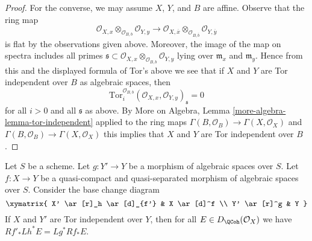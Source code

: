\begin{proof}
\medskip\noindent
For the converse, we may assume $X$, $Y$, and $B$ are affine.
Observe that the ring map
$$
\mathcal{O}_{X, x} \otimes_{\mathcal{O}_{B, b}} \mathcal{O}_{Y, y}
\longrightarrow
\mathcal{O}_{X, \overline{x}} \otimes_{\mathcal{O}_{B, \overline{b}}}
\mathcal{O}_{Y, \overline y}
$$
is flat by the observations given above. Moreover, the image of the map
on spectra includes all primes
$\mathfrak s \subset
\mathcal{O}_{X, x} \otimes_{\mathcal{O}_{B, b}} \mathcal{O}_{Y, y}$
lying over $\mathfrak m_x$ and $\mathfrak m_y$.
Hence from this and the displayed formula of Tor's above we see that if
$X$ and $Y$ are Tor independent over $B$ as algebraic spaces, then
$$
\text{Tor}_i^{\mathcal{O}_{B, b}}
(\mathcal{O}_{X, x}, \mathcal{O}_{Y, y})_\mathfrak s = 0
$$
for all $i > 0$ and all $\mathfrak s$ as above. By
More on Algebra, Lemma \ref{more-algebra-lemma-tor-independent}
applied to the ring maps
$\Gamma(B, \mathcal{O}_B) \to \Gamma(X, \mathcal{O}_X)$
and
$\Gamma(B, \mathcal{O}_B) \to \Gamma(X, \mathcal{O}_X)$
this implies that $X$ and $Y$ are Tor independent over $B$.
\end{proof}

\begin{lemma}
\label{lemma-compare-base-change}
Let $S$ be a scheme. Let $g : Y' \to Y$ be a morphism of algebraic spaces over
$S$. Let $f : X \to Y$ be a quasi-compact and quasi-separated morphism of
algebraic spaces over $S$. Consider the base change diagram
$$
\xymatrix{
X' \ar[r]_h \ar[d]_{f'} &
X \ar[d]^f \\
Y' \ar[r]^g &
Y
}
$$
If $X$ and $Y'$ are Tor independent over $Y$, then for all
$E \in D_\QCoh(\mathcal{O}_X)$ we have
$Rf'_*Lh^*E = Lg^*Rf_*E$.
\end{lemma}

